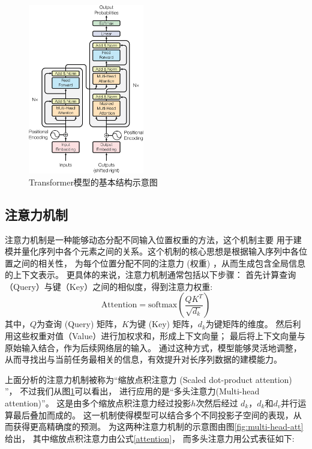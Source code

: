 \begin{figure}[htbp]
  \centering
  \includegraphics[width=0.45\textwidth]{figures/transformer.png}
  \caption{Transformer模型的基本结构示意图\cite{vaswani2017attention}}
  \label{transformer}
\end{figure}

\subsection{注意力机制}
注意力机制是一种能够动态分配不同输入位置权重的方法，这个机制主要
用于建模并量化序列中各个元素之间的关系。这个机制的核心思想是根据输入序列中各位置之间的相关性，
为每个位置分配不同的注意力 (权重) ，从而生成包含全局信息的上下文表示。
更具体的来说，注意力机制通常包括以下步骤：
首先计算查询（Query）与键（Key）之间的相似度，得到注意力权重\cite{vaswani2017attention}:
\begin{equation}
  \label{attention}
  \text{Attention} = \text{softmax}\left(\frac{QK^T}{\sqrt{d_k}}\right)
\end{equation}
其中，$Q$为查询 (Query) 矩阵，$K$为键 (Key) 矩阵，$d_k$为键矩阵的维度。
然后利用这些权重对值（Value）进行加权求和，形成上下文向量；
最后将上下文向量与原始输入结合，作为后续网络层的输入。
通过这种方式，模型能够灵活地调整，
从而寻找出与当前任务最相关的信息，有效提升对长序列数据的建模能力。

上面分析的注意力机制被称为“缩放点积注意力 (Scaled dot-product attention) ”，
不过我们从图\ref{transformer}可以看出，
进行应用的是“多头注意力(Multi-head attention)”。
这是由多个缩放点积注意力经过投影$h$次然后经过
$d_k$，$d_k$和$d_v$并行运算最后叠加而成的。
这一机制使得模型可以结合多个不同投影子空间的表现，从而获得更高精确度的预测。
为这两种注意力机制的示意图由图\ref{fig:multi-head-att}给出，
其中缩放点积注意力由公式\ref{attention}，
而多头注意力用公式表征如下\cite{vaswani2017attention}:

